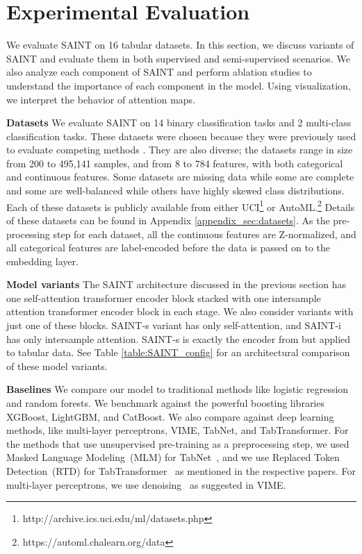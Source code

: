 \section{Experimental Evaluation}
\label{sec:expts}
We evaluate SAINT on 16 tabular datasets. In this section, we discuss variants of SAINT and evaluate them in both supervised and semi-supervised scenarios. We also analyze each component of SAINT and perform ablation studies to understand the importance of each component in the model. Using visualization, we interpret the behavior of attention maps.   

\textbf{Datasets} We evaluate SAINT on 14 binary classification tasks and 2 multi-class classification tasks. These datasets were chosen because they were previously used to evaluate competing methods \cite{yoon2020vime,arik2019TabNet,huang2020tabtransformer}. They are also diverse; the datasets range in size from 200 to 495,141 samples, and from 8 to 784 features, with both categorical and continuous features. Some datasets are missing data while some are complete and some are well-balanced while others have highly skewed class distributions. Each of these datasets is publicly available from either UCI\footnote{http://archive.ics.uci.edu/ml/datasets.php} or AutoML.\footnote{https://automl.chalearn.org/data} Details of these datasets can be found in Appendix \ref{appendix_sec:datasets}. As the pre-processing step for each dataset, all the continuous features are Z-normalized, and all categorical features are label-encoded before the data is passed on to the embedding layer.

\textbf{Model variants} The SAINT architecture discussed in the previous section has one self-attention transformer encoder block stacked with one intersample attention transformer encoder block in each stage. We also consider variants with just one of these blocks. SAINT-s variant has only self-attention, and SAINT-i has only intersample attention. SAINT-s is exactly the encoder from \cite{vaswani2017attention} but applied to tabular data. See Table \ref{table:SAINT_config} for an architectural comparison of these model variants.

\textbf{Baselines} We compare our model to traditional methods like logistic regression and random forests. We benchmark against the powerful boosting libraries XGBoost, LightGBM, and CatBoost. We also compare against deep learning methods, like multi-layer perceptrons, VIME, TabNet, and TabTransformer. For the methods that use unsupervised pre-training as a preprocessing step, we used Masked Language Modeling~(MLM) for TabNet~\cite{devlin2018bert}, and we use Replaced Token Detection~(RTD) for TabTransformer~\cite{clark2020electra} as mentioned in the respective papers. For multi-layer perceptrons, we use denoising~\cite{vincent2008extracting} as suggested in VIME. 

